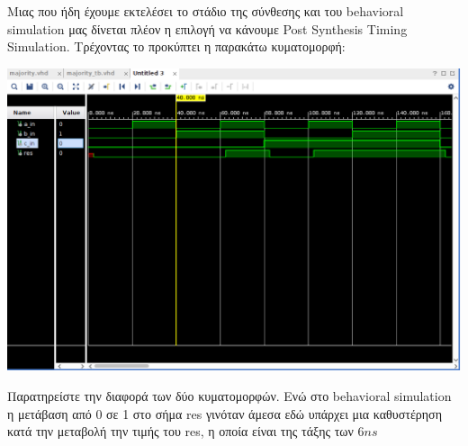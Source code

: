 \documentclass[]{article}
\begin{document}
\newpage

Μιας που ήδη έχουμε εκτελέσει το στάδιο της σύνθεσης και του behavioral simulation μας δίνεται πλέον η επιλογή να κάνουμε Post Synthesis Timing Simulation.
Τρέχοντας το προκύπτει η παρακάτω κυματομορφή:
\begin{center}
	\includegraphics[width=\textwidth]{post_synthesis_timing.png}
\end{center}

Παρατηρείστε την διαφορά των δύο κυματομορφών. Ενώ στο behavioral simulation η μετάβαση από 0 σε 1 στο σήμα res γινόταν άμεσα εδώ
υπάρχει μια καθυστέρηση κατά την μεταβολή την τιμής του res, η οποία είναι της τάξης των $6ns$
\end{document}

